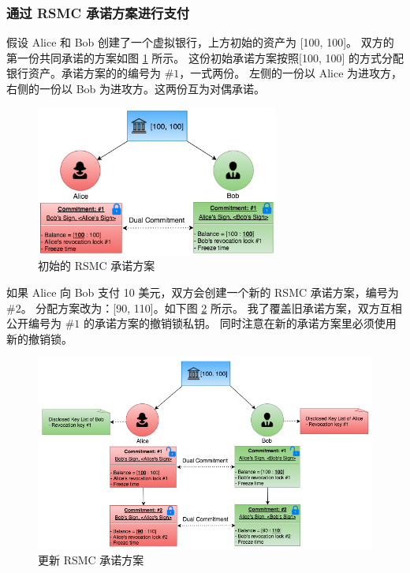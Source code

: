 \subsubsection{通过 RSMC 承诺方案进行支付}

假设 Alice 和 Bob 创建了一个虚拟银行，上方初始的资产为 [100, 100]。
双方的第一份共同承诺的方案如图 \ref{fig:rsmc_1} 所示。
这份初始承诺方案按照[100, 100] 的方式分配银行资产。承诺方案的的编号为 $\#1$，一式两份。
左侧的一份以 Alice 为进攻方，右侧的一份以 Bob 为进攻方。这两份互为对偶承诺。
\begin{figure}[h!]
    \centering
    \includegraphics[width=8cm, keepaspectratio]{../images/rsmc_1.png}
    \caption{初始的 RSMC 承诺方案}
    \label{fig:rsmc_1}
\end{figure}

如果 Alice 向 Bob 支付 10 美元，双方会创建一个新的 RSMC 承诺方案，编号为 $\#2$。
分配方案改为：[90, 110]。如下图 \ref{fig:rsmc_2} 所示。
我了覆盖旧承诺方案，双方互相公开编号为 $\#1$ 的承诺方案的撤销锁私钥。
同时注意在新的承诺方案里必须使用新的撤销锁。

\begin{figure}[h!]
    \centering
    \includegraphics[width=16cm, keepaspectratio]{../images/rsmc_2.png}
    \caption{更新 RSMC 承诺方案}
    \label{fig:rsmc_2}
\end{figure}

